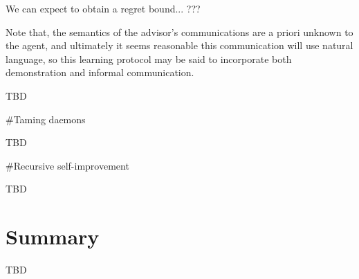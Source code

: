 \documentclass[a4paper]{article}
\begin{document}
We can expect to obtain a regret bound... ??? %

Note that, the semantics of the advisor's communications are a priori unknown to the agent, and ultimately it seems reasonable this communication will use natural language, so this learning protocol may be said to incorporate both demonstration and informal communication.


TBD

\#Taming daemons


TBD

\#Recursive self-improvement

TBD

\section{Summary}


TBD
\end{document}
